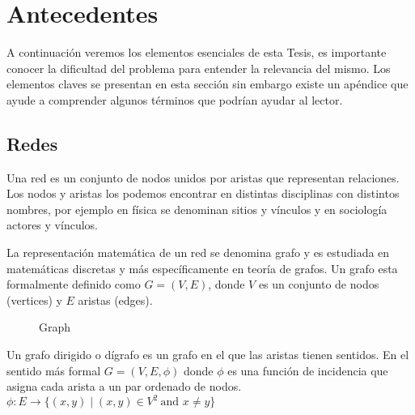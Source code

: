 
\chapter{Antecedentes} %
\label{sec:related}



A continuación veremos los elementos esenciales de esta Tesis, es importante conocer la dificultad del problema para entender la relevancia del mismo. Los elementos claves se presentan en esta sección sin embargo existe un apéndice que ayude a comprender algunos términos que podrían ayudar al lector.


\section{Redes}

Una red es un conjunto de nodos unidos por aristas que representan relaciones. Los nodos y aristas los podemos encontrar en distintas disciplinas con distintos nombres, por ejemplo en física se denominan sitios y vínculos y en sociología actores y vínculos. 

La representación matemática de un red se denomina grafo y es estudiada en matemáticas discretas y más específicamente en teoría de grafos. Un grafo esta formalmente definido como $G = (V,E)$, donde $V$ es un conjunto de nodos (vertices) y $E$ aristas (edges). \cite{saoub_graph_2021}

 \begin{figure}[htbp]
   \centering
   
    \caption{Graph}
    \label{fig:graph}
\end{figure}

Un grafo dirigido o dígrafo es un grafo en el que las aristas tienen sentidos. En el sentido más formal $G = (V,E,\phi)$ donde $\phi$ es una función de incidencia que asigna cada arista a un par ordenado de nodos. $ \phi :E \to \{(x,y)\mid (x,y)\in V^{2}\ \textrm{and } x \neq y \}$

